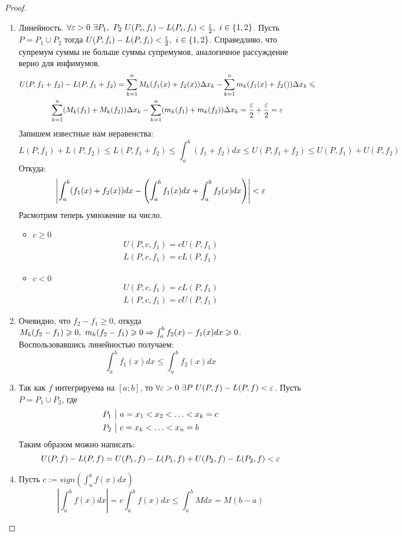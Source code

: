 \begin{proof}
	\begin{enumerate}
		\item Линейность. $\forall \eps > 0\ \exists P_1,\ P_2\ U(P_i, f_i) - L(P_i, f_i) < \frac{\eps}{2},\ i \in \{1, 2\}$.
		Пусть $P = P_1 \cup P_2$ тогда $U(P, f_i) - L(P, f_i) < \frac{\varepsilon}{2},\ i \in \{1, 2\}$.
		Справедливо, что супремум суммы не больше суммы супремумов, аналогичное рассуждение верно для инфимумов.
		\begin{multline*}
			U(P, f_1 + f_2) - L(P, f_1 + f_2) = \sum\limits_{k = 1}^nM_k(f_1(x) + f_2(x))\Delta x_k - \sum\limits_{k = 1}^nm_k(f_1(x) + f_2())\Delta x_k \leqslant
			\\
			\sum\limits_{k = 1}^n(M_k(f_1) + M_k(f_2))\Delta x_k - \sum\limits_{k = 1}^n(m_k(f_1) + m_k(f_2))\Delta x_k = \frac{\varepsilon}{2} + \frac{\varepsilon}{2} = \varepsilon
		\end{multline*}
		Запишем известные нам неравенства:
		\[
			L(P, f_1) + L(P, f_2) \leq L(P, f_1 + f_2) \leq \int_{a}^{b}(f_1 + f_2)dx \leq U(P, f_1 + f_2) \leq U(P, f_1) + U(P, f_2)
		\]
		Откуда:
		\[
			\left|\int_a^b(f_1(x) + f_2(x))dx - \left(\int_a^bf_1(x)dx + \int_a^bf_2(x)dx\right)\right| < \varepsilon
		\]
		Расмотрим теперь умножение на число.
		\begin{itemize}
			\item $c \geq 0$
				\begin{align*}
					& U(P, c, f_1) = cU(P, f_1)
					\\
					& L(P, c, f_1) = cL(P, f_1)
				\end{align*}
			\item $c < 0$
				\begin{align*}
					& U(P, c, f_1) = cL(P, f_1)
					\\
					& L(P, c, f_1) = cU(P, f_1)
				\end{align*}
		\end{itemize}
		\item Очевидно, что $f_2 - f_1 \geq 0$, откуда $M_k(f_2 - f_1) \geqslant 0,\ m_k(f_2 - f_1) \geqslant 0 \Rightarrow \int_a^bf_2(x)-f_1(x)dx \geqslant 0$.
		Воспользовавшись линейностью получаем:
		\[
			\int_a^bf_1(x)dx \leq \int_a^bf_2(x)dx
		\]
		
		\item Так как $f$ интегрируема на $[a;b]$, то $\forall\varepsilon > 0\ \exists P\ U(P, f) - L(P, f) < \varepsilon$.
		Пусть $P = P_1 \cup P_2$, где 
		\begin{align*}
			&P_1\ \big|\  a = x_1 < x_2 < \ldots < x_k = c
			\\
			&P_2\ \big|\  c = x_k < \ldots < x_n = b
		\end{align*}
		Таким образом можно написать:
		\[
			U(P, f) - L(P, f) = U(P_1, f) - L(P_1, f) + U(P_2, f) - L(P_2, f) < \varepsilon
		\]
		\item Пусть $c := sign\left(\int_a^bf(x)dx\right)$
		\[
			\left|\int_a^bf(x)dx\right| = c \int_a^bf(x)dx \leq \int_a^bMdx  = M(b - a)
		\]
	\end{enumerate}
\end{proof}

